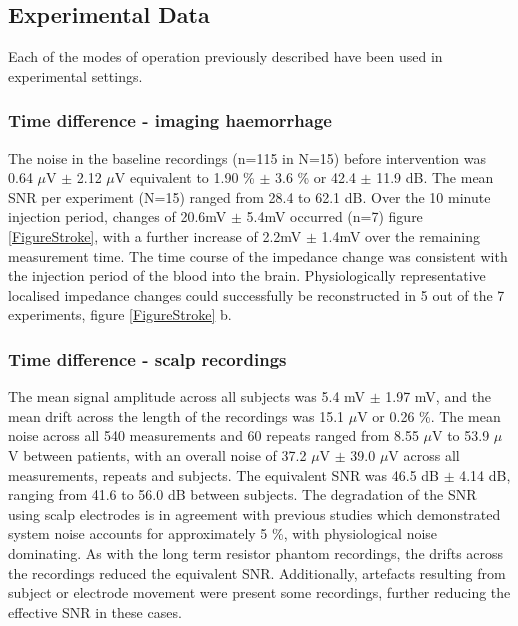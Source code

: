 \subsection{Experimental Data}

Each of the modes of operation previously described have been used in experimental settings. 

\subsubsection{Time difference - imaging haemorrhage}
The noise in the baseline recordings (n=115 in N=15) before intervention was 0.64 $\mu$V $\pm$ 2.12 $\mu$V equivalent to 1.90 \% $\pm$ 3.6 \% or 42.4 $\pm$ 11.9 dB. The mean SNR per experiment (N=15) ranged from 28.4 to 62.1 dB. Over the 10 minute injection period, changes of 20.6mV \(\pm\) 5.4mV occurred (n=7) figure \ref{FigureStroke}, with a further increase of 2.2mV \(\pm\) 1.4mV over the remaining measurement time. The time course of the impedance change was consistent with the injection period of the blood into the brain. Physiologically representative localised impedance changes could successfully be reconstructed in 5 out of the 7 experiments, figure \ref{FigureStroke} b. 


\subsubsection{Time difference - scalp recordings}
The mean signal amplitude across all subjects was 5.4 mV $\pm$ 1.97 mV, and the mean drift across the length of the recordings was 15.1 $\mu$V or 0.26 \%. The mean noise across all 540 measurements and 60 repeats ranged from 8.55 $\mu$V to 53.9 $\mu$V between patients, with an overall noise of 37.2  $\mu$V $\pm$ 39.0 $\mu$V across all measurements, repeats and subjects. The equivalent SNR was 46.5 dB $\pm$ 4.14 dB, ranging from 41.6 to 56.0 dB between subjects. The degradation of the SNR using scalp electrodes is in agreement with previous studies \cite{fabrizi2007analysis} which demonstrated system noise accounts for approximately 5 \%, with physiological noise dominating. As with the long term resistor phantom recordings, the drifts across the recordings reduced the equivalent SNR. Additionally, artefacts resulting from subject or electrode movement were present some recordings, further reducing the effective SNR in these cases.  


